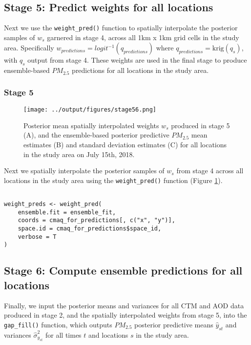\documentclass[12pt]{article}
\begin{document}
\subsection*{Stage 5: Predict weights for all locations}

Next we use the \texttt{weight\_pred()} function to spatially interpolate the posterior samples of $w_s$ garnered in stage 4, across all 1km x 1km grid cells in the study area. 
Specifically $w_{predictions} = logit^{-1}(q_{predictions})$ where $q_{predictions} = \text{krig}(q_s)$, with $q_s$ output from stage 4.
These weights are used in the final stage to produce ensemble-based $PM_{2.5}$ predictions for all locations in the study area.


\subsubsection*{Stage 5}


\begin{figure}[ht]
    \centering
    \texttt{[image: ../output/figures/stage56.png]}
    \caption{Posterior mean spatially interpolated weights $w_s$ produced in stage 5 (A), and the ensemble-based posterior predictive $PM_{2.5}$ mean estimates (B) and standard deviation estimates (C) for all locations in the study area on July 15th, 2018.}
    \label{fig:stage56}
\end{figure}

Next we spatially interpolate the posterior samples of $w_s$ from stage 4 across all locations in the study area using the \texttt{weight\_pred()} function (Figure \ref{fig:stage56}).

\begin{lstlisting}

weight_preds <- weight_pred(
    ensemble.fit = ensemble_fit,
    coords = cmaq_for_predictions[, c("x", "y")],
    space.id = cmaq_for_predictions$space_id,
    verbose = T
)

\end{lstlisting}



\subsection*{Stage 6: Compute ensemble predictions for all locations}

Finally, we input the posterior means and variances for all CTM and AOD data produced in stage 2, and the spatially interpolated weights from stage 5, into the \texttt{gap\_fill()} function, which outputs $PM_{2.5}$ posterior predictive means $\hat{y}_{st}$ and variances $\hat{\sigma}^{2}_{y_{st}}$ for all times $t$ and locations $s$ in the study area. 
\end{document}
